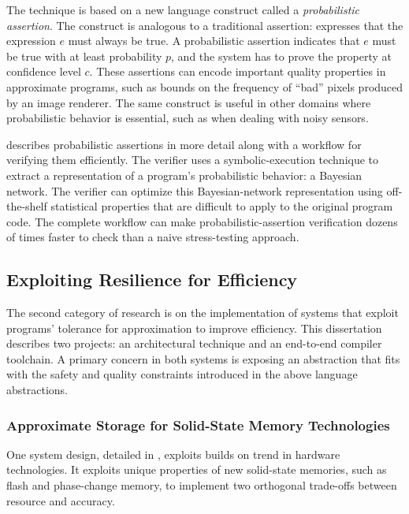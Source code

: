 The technique is based on a new language construct called a
\emph{probabilistic assertion}.
The construct is analogous to a traditional assertion: 
expresses that the expression $e$ must always be true.
A probabilistic assertion  indicates that $e$ must
be true with at least probability $p$, and the system has to prove the
property at confidence level $c$.
These assertions can encode important quality properties in approximate
programs, such as bounds on the frequency of ``bad'' pixels produced by an
image renderer.
The same construct is useful in other domains where probabilistic behavior is
essential, such as when dealing with noisy sensors.

 describes probabilistic assertions in more detail
along with a workflow for verifying them efficiently.
The verifier uses a symbolic-execution technique to extract a representation
of a program's probabilistic behavior: a Bayesian network.
The verifier can optimize this Bayesian-network representation using
off-the-shelf statistical properties that are difficult to apply to the
original program code.
The complete workflow can make probabilistic-assertion verification dozens of
times faster to check than a naive stress-testing approach.

\subsection{Exploiting Resilience for Efficiency}

The second category of research is on the implementation of systems that
exploit programs' tolerance for approximation to improve efficiency.
This dissertation describes two projects: an architectural technique and an
end-to-end compiler toolchain.
A primary concern in both systems is exposing an abstraction that fits with
the safety and quality constraints introduced in the above language
abstractions.

\subsubsection{Approximate Storage for Solid-State Memory Technologies}

One system design, detailed in , exploits builds on trend in hardware technologies.
It exploits unique properties of new solid-state memories,
such as flash and phase-change memory,
to implement two orthogonal trade-offs between resource and accuracy.

